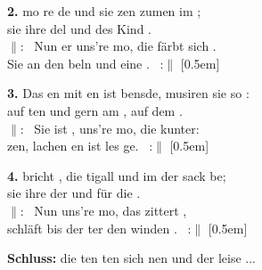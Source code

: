 \textbf{2.} mo  re de und sie zen zumen im ; \\
sie  ihre del und des Kind . \\
$\|$:~ Nun er uns're mo, die  färbt sich . \\
Sie  an den beln und  eine . ~:$\|$ [0.5em]

\noindent\textbf{3.} Das en mit en ist bensde, musiren  sie so : \\
auf ten und gern am , auf dem . \\
$\|$:~ Sie ist , uns're mo, die  kunter: \\
zen, lachen en ist les ge. ~:$\|$ [0.5em]

\noindent\textbf{4.}  bricht , die tigall  und im  der sack be; \\
sie  ihre der und  für die . \\
$\|$:~ Nun  uns're mo, das  zittert , \\
 schläft bis der ter den winden . ~:$\|$ [0.5em]

\noindent\textbf{Schluss:}  die ten ten sich nen und der  leise ...
